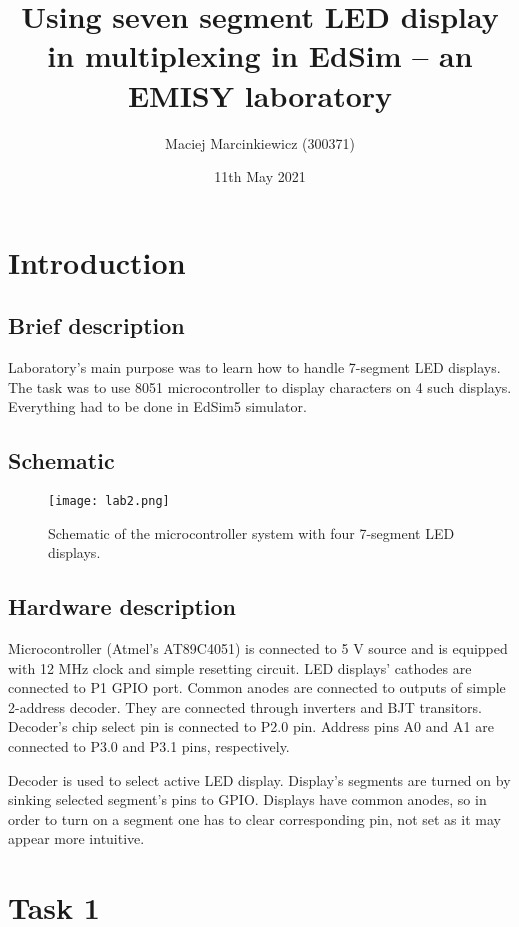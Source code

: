 \documentclass{article}
\title{Using seven segment LED display in multiplexing in EdSim -- an EMISY laboratory}
\author{Maciej Marcinkiewicz (300371)}
\date{11th May 2021}
\begin{document}
\maketitle

\section{Introduction}
\subsection{Brief description}
Laboratory's main purpose was to learn how to handle 7-segment LED displays. The task
was to use 8051 microcontroller to display characters on 4 such displays. Everything
had to be done in EdSim5 simulator.

\subsection{Schematic}
\begin{figure}[h!] %
    \centering
        \texttt{[image: lab2.png]}
    \caption{Schematic of the microcontroller system with four 7-segment LED displays.}
\end{figure}

\subsection{Hardware description}
Microcontroller (Atmel's AT89C4051) is connected to 5 V source and is equipped with 12 MHz clock and 
simple resetting circuit. LED displays' cathodes are connected to P1 GPIO port. Common anodes
are connected to outputs of simple 2-address decoder. They are connected through inverters
and BJT transitors. Decoder's chip select pin is connected to P2.0 pin. Address pins
A0 and A1 are connected to P3.0 and P3.1 pins, respectively.

Decoder is used to select active LED display. Display's segments are turned on by
sinking selected segment's pins to GPIO. Displays have common anodes, so in order to
turn on a segment one has to clear corresponding pin, not set as it may appear more intuitive.

\section{Task 1}
\end{document}
